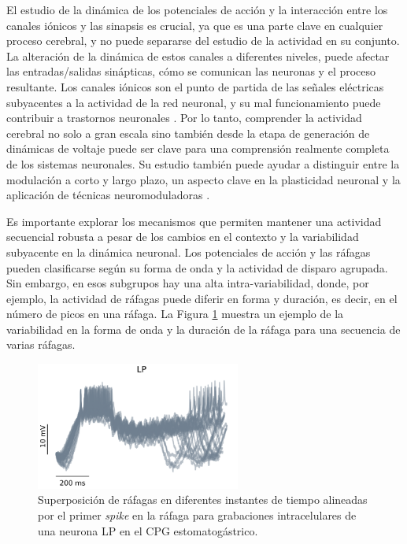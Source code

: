 El estudio de la dinámica de los potenciales de acción y la interacción entre los canales iónicos y las sinapsis es crucial, ya que es una parte clave en cualquier proceso cerebral, y no puede separarse del estudio de la actividad en su conjunto. La alteración de la dinámica de estos canales a diferentes niveles, puede afectar las entradas/salidas sinápticas, cómo se comunican las neuronas y el proceso resultante. Los canales iónicos son el punto de partida de las señales eléctricas subyacentes a la actividad de la red neuronal, y su mal funcionamiento puede contribuir a trastornos neuronales \parencite{kecskes_editorial_2023}. Por lo tanto, comprender la actividad cerebral no solo a gran escala sino también desde la etapa de generación de dinámicas de voltaje puede ser clave para una comprensión realmente completa de los sistemas neuronales. Su estudio también puede ayudar a distinguir entre la modulación a corto y largo plazo, un aspecto clave en la plasticidad neuronal y la aplicación de técnicas neuromoduladoras \parencite{chambers_lightactivated_2008,burke_modulation_2019}.

Es importante explorar los mecanismos que permiten mantener una actividad secuencial robusta a pesar de los cambios en el contexto y la variabilidad subyacente en la dinámica neuronal. Los potenciales de acción y las ráfagas pueden clasificarse según su forma de onda y la actividad de disparo agrupada. Sin embargo, en esos subgrupos hay una alta intra-variabilidad, donde, por ejemplo, la actividad de ráfagas puede diferir en forma y duración, es decir, en el número de picos en una ráfaga. La Figura \ref{fig:burst variability spanish} muestra un ejemplo de la variabilidad en la forma de onda y la duración de la ráfaga para una secuencia de varias ráfagas.

\begin{figure}[htb!]
	\centering
	\includegraphics[width=0.6\textwidth]{img/intro/burst_variability.png}
	\caption{Superposición de ráfagas en diferentes instantes de tiempo alineadas por el primer \textit{spike} en la ráfaga para grabaciones intracelulares de una neurona LP en el CPG estomatogástrico.}
	\label{fig:burst variability spanish}
\end{figure}

